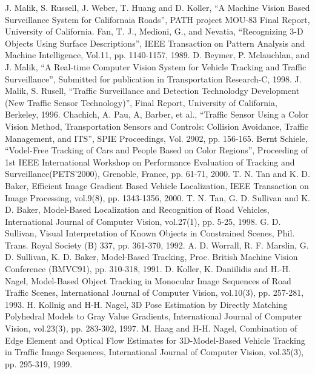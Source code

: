 \begin{thebibliography}{200}
 J. Malik, S. Russell, J. Weber, T. Huang and D. Koller, ``A Machine Vision Based Surveillance System for Californaia Roads'', PATH project MOU-83 Final Report, University of California.
 Fan, T. J., Medioni, G., and Nevatia, ``Recognizing 3-D Objects Using Surface Descriptions'', IEEE Transaction on Pattern Analysis and Machine Intelligence, Vol.11, pp. 1140-1157, 1989.
 D. Beymer, P. Mclauchlan, and J. Malik, ``A Real-time Computer Vision System for Vehicle Tracking and Traffic Surveillance'', Submitted for publication in Transportation Research-C, 1998.
 J. Malik, S. Rusell, ``Traffic Surveillance and Detection Technolodgy Development (New Traffic Sensor Technology)'', Final Report, University of California, Berkeley, 1996.
 Chachich, A. Pau, A, Barber, et al., ``Traffic Sensor Using a Color Vision Method, Transportation Sensors and Controls: Collision Avoidance, Traffic Management, and ITS'', SPIE Proceedings, Vol. 2902, pp. 156-165.
 Bernt Schiele, ``Vodel-Free Tracking of Cars and People Based on Color Regions'', Proceeding of 1st IEEE International Workshop on Performance Evaluation of Tracking and Surveillance(PETS'2000), Grenoble, France, pp. 61-71, 2000.
 T. N. Tan and K. D. Baker, Efficient Image Gradient Based Vehicle Localization, IEEE Transaction on Image Processing, vol.9(8), pp. 1343-1356, 2000.
 T. N. Tan, G. D. Sullivan and K. D. Baker, Model-Based Localization and Recognition of Road Vehicles, International Journal of Computer Vision, vol.27(1), pp. 5-25, 1998.
 G. D. Sullivan, Visual Interpretation of Known Objects in Constrained Scenes, Phil. Trans. Royal Society (B) 337, pp. 361-370, 1992.
 A. D. Worrall, R. F. Marslin, G. D. Sullivan, K. D. Baker, Model-Based Tracking, Proc. British Machine Vision Conference (BMVC91), pp. 310-318, 1991.
 D. Koller, K. Daniilidis and H.-H. Nagel, Model-Based Object Tracking in Monocular Image Sequences of Road Traffic Scenes, International Journal of Computer Vision, vol.10(3), pp. 257-281, 1993.
 H. Kollnig and H-H. Nagel, 3D Pose Estimation by Directly Matching Polyhedral Models to Gray Value Gradients, International Journal of Computer Vision, vol.23(3), pp. 283-302, 1997.
 M. Haag and H-H. Nagel, Combination of Edge Element and Optical Flow Estimates for 3D-Model-Based Vehicle Tracking in Traffic Image Sequences, International Journal of Computer Vision, vol.35(3), pp. 295-319, 1999.

\end{thebibliography}
